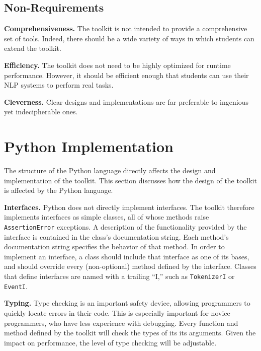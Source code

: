 \documentclass[11pt]{article}
\begin{document}
\subsection{Non-Requirements}

\noindent\textbf{Comprehensiveness.} The toolkit is not intended to
provide a comprehensive set of tools.  Indeed, there should be a wide
variety of ways in which students can extend the toolkit.

\noindent\textbf{Efficiency.} The toolkit does not need to be highly
optimized for runtime performance.  However, it should be efficient
enough that students can use their NLP systems to perform real tasks.

\noindent\textbf{Cleverness.} Clear designs and implementations are
far preferable to ingenious yet indecipherable ones.

\section{Python Implementation}

The structure of the Python language directly affects the design and
implementation of the toolkit.  This section discusses how the design
of the toolkit is affected by the Python language.

\noindent\textbf{Interfaces.}
Python does not directly implement interfaces.  The toolkit
therefore implements interfaces as simple classes, all of whose methods 
raise \texttt{AssertionError} exceptions.  A description of the
functionality provided by the interface is contained in the
class's documentation string.  Each method's documentation string
specifies the behavior of that method.
In order to implement an interface, a class should include that
interface as one of its bases, and should override every
(non-optional) method defined by the interface.
Classes that define interfaces are named with a trailing ``I,'' such
as \texttt{TokenizerI} or \texttt{EventI}.

\noindent\textbf{Typing.}
Type checking is an important safety device, allowing programmers to
quickly locate errors in their code.  This is especially important for
novice programmers, who have less experience with debugging.  Every
function and method defined by the toolkit will check the types of its
its arguments.  Given the impact on performance, the level of type checking
will be adjustable.
\end{document}
